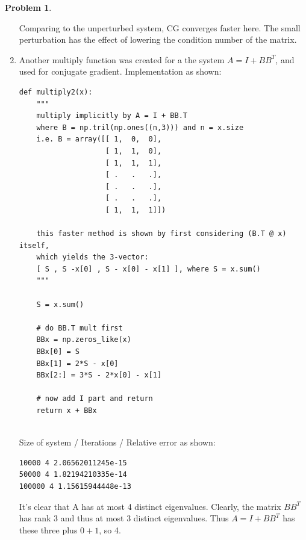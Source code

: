 \documentclass[10pt]{article}
\theoremstyle{definition}
\newtheorem{prob}{Problem}
\begin{document}
\begin{prob}
\begin{enumerate}[\bfseries(a)]
Comparing to the unperturbed system, CG converges faster here. The small perturbation has the effect of lowering the condition number of the matrix.

\item Another multiply function was created for a the system $A = I + BB^T$, and used for conjugate gradient. Implementation as shown:

\begin{lstlisting}
def multiply2(x):
    """
    multiply implicitly by A = I + BB.T
    where B = np.tril(np.ones((n,3))) and n = x.size
    i.e. B = array([[ 1,  0,  0],
                    [ 1,  1,  0],
                    [ 1,  1,  1],
                    [ .   .   .],
                    [ .   .   .],
                    [ .   .   .],
                    [ 1,  1,  1]])

    this faster method is shown by first considering (B.T @ x) itself,
    which yields the 3-vector:
    [ S , S -x[0] , S - x[0] - x[1] ], where S = x.sum()
    """

    S = x.sum()
    
    # do BB.T mult first
    BBx = np.zeros_like(x)
    BBx[0] = S
    BBx[1] = 2*S - x[0]
    BBx[2:] = 3*S - 2*x[0] - x[1]
    
    # now add I part and return
    return x + BBx
    

\end{lstlisting}

Size of system / Iterations / Relative error as shown:
\begin{verbatim}
10000 4 2.06562011245e-15
50000 4 1.82194210335e-14
100000 4 1.15615944448e-13
\end{verbatim}

It's clear that A has at most 4 distinct eigenvalues. Clearly, the matrix $BB^T$ has rank 3 and thus at most 3 distinct eigenvalues. Thus $A = I + BB^T$ has these three plus $0+1$, so 4.
\end{enumerate}
\end{prob}
\end{document}
